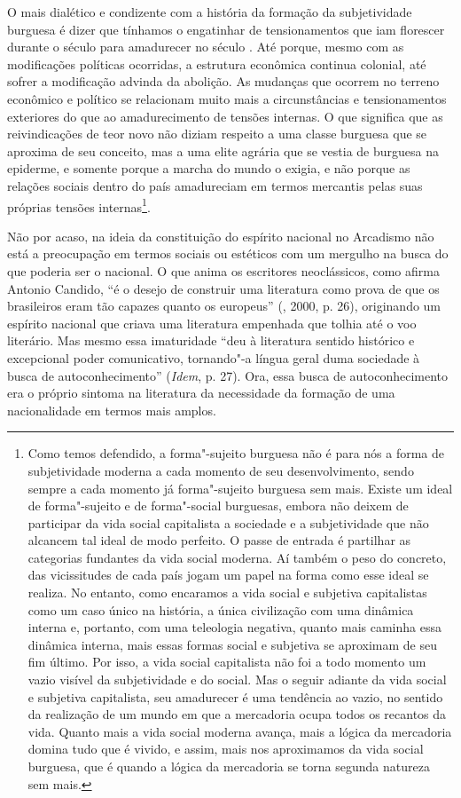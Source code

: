 O mais dialético e condizente com a história da formação da
subjetividade burguesa é dizer que tínhamos o engatinhar de
tensionamentos que iam florescer durante o século  para amadurecer no
século . Até porque, mesmo com as modificações políticas ocorridas, a
estrutura econômica continua colonial, até sofrer a modificação advinda
da abolição. As mudanças que ocorrem no terreno econômico e político se
relacionam muito mais a circunstâncias e tensionamentos exteriores do
que ao amadurecimento de tensões internas. O que significa que as
reivindicações de teor novo não diziam respeito a uma classe burguesa
que se aproxima de seu conceito, mas a uma elite agrária que se vestia
de burguesa na epiderme, e somente porque a marcha do mundo o exigia, e
não porque as relações sociais dentro do país amadureciam em termos
mercantis pelas suas próprias tensões internas\footnote{Como temos
  defendido, a forma"-sujeito burguesa não é para nós a forma de
  subjetividade moderna a cada momento de seu desenvolvimento, sendo
  sempre a cada momento já forma"-sujeito burguesa sem mais. Existe um
  ideal de forma"-sujeito e de forma"-social burguesas, embora não deixem
  de participar da vida social capitalista a sociedade e a subjetividade
  que não alcancem tal ideal de modo perfeito. O passe de entrada é
  partilhar as categorias fundantes da vida social moderna. Aí também o
  peso do concreto, das vicissitudes de cada país jogam um papel na
  forma como esse ideal se realiza. No entanto, como encaramos a vida
  social e subjetiva capitalistas como um caso único na história, a
  única civilização com uma dinâmica interna e, portanto, com
  uma teleologia negativa, quanto mais caminha essa dinâmica interna,
  mais essas formas social e subjetiva se aproximam de seu fim último.
  Por isso, a vida social capitalista não foi a todo momento um vazio
  visível da subjetividade e do social. Mas o seguir adiante da vida
  social e subjetiva capitalista, seu amadurecer é uma tendência ao
  vazio, no sentido da realização de um mundo em que a mercadoria ocupa
  todos os recantos da vida. Quanto mais a vida social moderna avança,
  mais a lógica da mercadoria domina tudo que é vivido, e assim, mais
  nos aproximamos da vida social burguesa, que é quando a lógica da
  mercadoria se torna segunda natureza sem mais.}.

Não por acaso, na ideia da constituição do espírito nacional no
Arcadismo não está a preocupação em termos sociais ou estéticos com um
mergulho na busca do que poderia ser o nacional. O que anima os
escritores neoclássicos, como afirma Antonio Candido, ``é o desejo de
construir uma literatura como prova de que os brasileiros eram tão
capazes quanto os europeus'' (, 2000, p. 26), originando um
espírito nacional que criava uma literatura empenhada que tolhia até o
voo literário. Mas mesmo essa imaturidade ``deu à literatura sentido
histórico e excepcional poder comunicativo, tornando"-a língua geral duma
sociedade à busca de autoconhecimento'' (\emph{Idem}, p. 27). Ora, essa
busca de autoconhecimento era o próprio sintoma na literatura da
necessidade da formação de uma nacionalidade em termos mais amplos.

